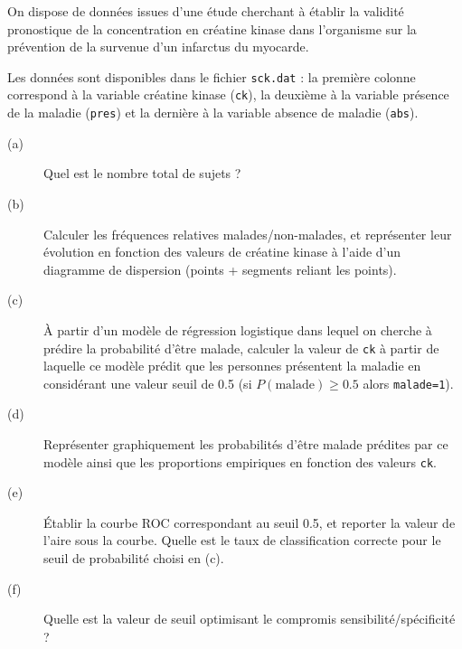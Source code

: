 \begin{exo}\label{exo:6.3}
On dispose de données issues d'une étude cherchant à établir la validité
pronostique de la concentration en créatine kinase dans l'organisme sur la
prévention de la survenue d'un infarctus du myocarde.\autocite[p.~115]{rabe-hesketh04}

Les données sont disponibles dans le fichier \texttt{sck.dat} : la première
colonne correspond à la variable créatine kinase (\texttt{ck}), la deuxième
à la variable présence de la maladie (\texttt{pres}) et la dernière à la
variable absence de maladie (\texttt{abs}).
\begin{description}
\item[(a)] Quel est le nombre total de sujets ?
\item[(b)] Calculer les fréquences relatives malades/non-malades, et
  représenter leur évolution en fonction des valeurs de créatine kinase à
  l'aide d'un diagramme de dispersion (points + segments reliant les points).
\item[(c)] À partir d'un modèle de régression logistique dans lequel on
  cherche à prédire la probabilité d'être malade, calculer la valeur de
  \texttt{ck} à partir de laquelle ce modèle prédit que les personnes
  présentent la maladie en considérant une valeur seuil de 0.5
  (si $P(\text{malade})\ge 0.5$ alors \texttt{malade=1}).
\item[(d)] Représenter graphiquement les probabilités d'être malade prédites
  par ce modèle ainsi que les proportions empiriques en fonction des valeurs
  \texttt{ck}. 
\item[(e)] Établir la courbe ROC correspondant au seuil 0.5, et reporter la
  valeur de l'aire sous la courbe. Quelle est le taux de classification
  correcte pour le seuil de probabilité choisi en (c).
\item[(f)] Quelle est la valeur de seuil optimisant le compromis
  sensibilité/spécificité ?
\end{description}
\end{exo}

